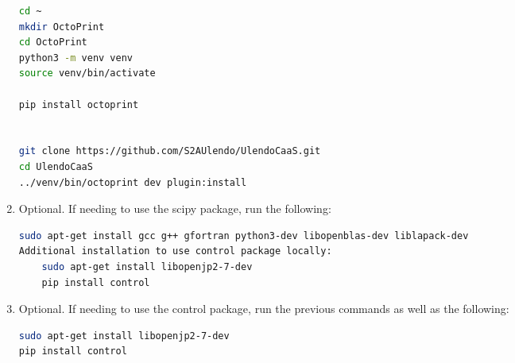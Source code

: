 \documentclass[12pt]{article}
\begin{document}
\begin{enumerate}
\begin{lstlisting}[language=bash]
cd ~
mkdir OctoPrint
cd OctoPrint
python3 -m venv venv
source venv/bin/activate

pip install octoprint


git clone https://github.com/S2AUlendo/UlendoCaaS.git
cd UlendoCaaS
../venv/bin/octoprint dev plugin:install
\end{lstlisting}
	\item Optional. If needing to use the scipy package, run the following:
\begin{lstlisting}[language=bash]
sudo apt-get install gcc g++ gfortran python3-dev libopenblas-dev liblapack-dev
Additional installation to use control package locally:
 	sudo apt-get install libopenjp2-7-dev
	pip install control

\end{lstlisting}
	\item Optional. If needing to use the control package, run the previous commands as well as the following:
\begin{lstlisting}[language=bash]
sudo apt-get install libopenjp2-7-dev
pip install control
\end{lstlisting}


\end{enumerate}
\end{document}
